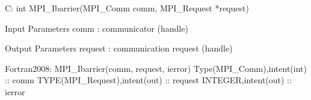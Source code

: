 C:
int MPI_Ibarrier(MPI_Comm comm, MPI_Request *request)

Input Parameters
comm : communicator (handle)

Output Parameters
request : communication request (handle)

Fortran2008:
MPI_Ibarrier(comm, request, ierror)
Type(MPI_Comm),intent(int) :: comm
TYPE(MPI_Request),intent(out) :: request
INTEGER,intent(out) :: ierror
